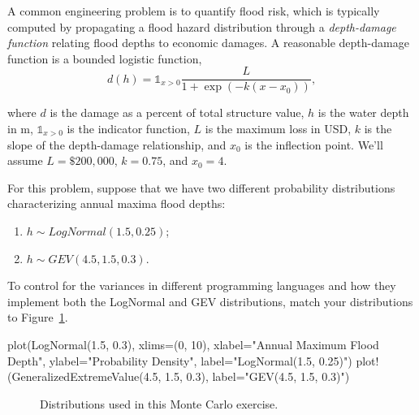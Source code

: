\documentclass[
  letterpaper,
  DIV=11,
  numbers=noendperiod]{scrartcl}
\newenvironment{Shaded}{\begin{snugshade}}{\end{snugshade}}
\newcommand{\FloatTok}[1]{\textcolor[rgb]{0.68,0.00,0.00}{#1}}
\newcommand{\FunctionTok}[1]{\textcolor[rgb]{0.28,0.35,0.67}{#1}}
\newcommand{\NormalTok}[1]{\textcolor[rgb]{0.00,0.23,0.31}{#1}}
\newcommand{\OperatorTok}[1]{\textcolor[rgb]{0.37,0.37,0.37}{#1}}
\newcommand{\StringTok}[1]{\textcolor[rgb]{0.13,0.47,0.30}{#1}}
\providecommand{\tightlist}{%
  \setlength{\itemsep}{0pt}\setlength{\parskip}{0pt}}\usepackage{longtable,booktabs,array}
\begin{document}
A common engineering problem is to quantify flood risk, which is
typically computed by propagating a flood hazard distribution through a
\emph{depth-damage function} relating flood depths to economic damages.
A reasonable depth-damage function is a bounded logistic function,
\[d(h) = \mathbb{1}_{x > 0} \frac{L}{1 + \exp(-k (x - x_0))},\]

where \(d\) is the damage as a percent of total structure value, \(h\)
is the water depth in m, \(\mathbb{1}_{x > 0}\) is the indicator
function, \(L\) is the maximum loss in USD, \(k\) is the slope of the
depth-damage relationship, and \(x_0\) is the inflection point. We'll
assume \(L=\$200,000\), \(k=0.75\), and \(x_0=4\).

For this problem, suppose that we have two different probability
distributions characterizing annual maxima flood depths:

\begin{enumerate}
\def\labelenumi{\arabic{enumi}.}
\tightlist
\item
  \(h \sim LogNormal(1.5, 0.25)\);
\item
  \(h \sim GEV(4.5, 1.5, 0.3)\).
\end{enumerate}

To control for the variances in different programming languages and how
they implement both the LogNormal and GEV distributions, match your
distributions to Figure~\ref{fig-dists}.

\begin{Shaded}
\begin{Highlighting}[]
\FunctionTok{plot}\NormalTok{(}\FunctionTok{LogNormal}\NormalTok{(}\FloatTok{1.5}\NormalTok{, }\FloatTok{0.3}\NormalTok{), xlims}\OperatorTok{=}\NormalTok{(}\FloatTok{0}\NormalTok{, }\FloatTok{10}\NormalTok{), xlabel}\OperatorTok{=}\StringTok{"Annual Maximum Flood Depth"}\NormalTok{, ylabel}\OperatorTok{=}\StringTok{"Probability Density"}\NormalTok{, label}\OperatorTok{=}\StringTok{"LogNormal(1.5, 0.25)"}\NormalTok{)}
\FunctionTok{plot!}\NormalTok{(}\FunctionTok{GeneralizedExtremeValue}\NormalTok{(}\FloatTok{4.5}\NormalTok{, }\FloatTok{1.5}\NormalTok{, }\FloatTok{0.3}\NormalTok{), label}\OperatorTok{=}\StringTok{"GEV(4.5, 1.5, 0.3)"}\NormalTok{)}
\end{Highlighting}
\end{Shaded}

\begin{figure}[H]


\caption{\label{fig-dists}Distributions used in this Monte Carlo
exercise.}

\end{figure}%
\end{document}
